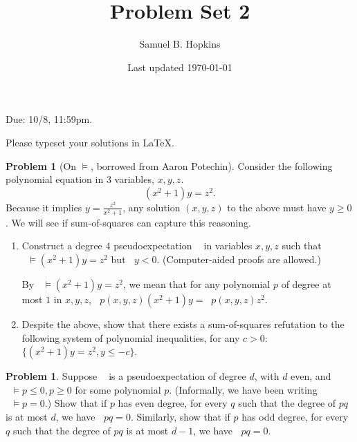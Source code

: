 \documentclass[11pt]{article}
\title{Problem Set 2}
\author{Samuel B. Hopkins}
\date{Last updated \today}
\theoremstyle{definition}
\newtheorem{problem}[theorem]{Problem}
\DeclareMathOperator{\pE}{\widetilde{\mathbb{E}}} %
\begin{document}
\maketitle

Due: 10/8, 11:59pm.

Please typeset your solutions in LaTeX.

\begin{problem}[On $\vDash$, borrowed from Aaron Potechin]

Consider the following polynomial equation in $3$ variables, $x,y,z$.
\[ (x^2 + 1) y = z^2. \]
Because it implies $y = \frac{z^2}{x^2+1}$, any solution $(x,y,z)$ to the above must have $y \ge 0$. We will see if sum-of-squares can capture this reasoning.

\begin{enumerate}
  \item Construct a degree $4$ pseudoexpectation $\pE$ in variables $x,y,z$ such that $\pE \vDash (x^2+1)y = z^2$ but $\pE y < 0$. (Computer-aided proofs are allowed.)

  By $\pE \vDash (x^2+1)y = z^2$, we mean that for any polynomial $p$ of degree at most $1$ in $x,y,z$, $\pE p(x,y,z)(x^2+1)y = \pE p(x,y,z)z^2$.

  \item Despite the above, show that there exists a sum-of-squares refutation to the following system of polynomial inequalities, for any $c > 0$: $\{ (x^2+1)y = z^2 , y \le -c \}$.
\end{enumerate}
\end{problem}

\begin{problem}
  Suppose $\pE$ is a pseudoexpectation of degree $d$, with $d$ even, and $\pE \vDash p \leq 0, p \geq 0$ for some polynomial $p$. (Informally, we have been writing $\pE \vDash p = 0$.)
  Show that if $p$ has even degree, for every $q$ such that the degree of $pq$ is at most $d$, we have $\pE pq = 0$. Similarly, show that if $p$ has odd degree, for every $q$ such that the degree of $pq$ is at most $d-1$, we have $\pE pq = 0$.
\end{problem}
\end{document}
